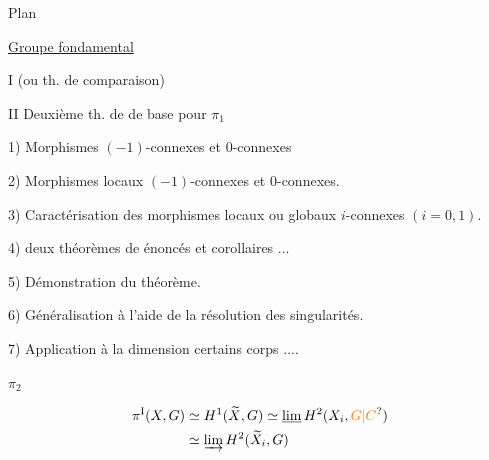 Plan


\uline{Groupe fondamental}

I   (ou th. de comparaison)

II Deuxième th. de  de base pour $\pi_1$

1) Morphismes $(-1)$-connexes et $0$-connexes

2) Morphismes locaux $(-1)$-connexes et $0$-connexes.

3)  Caractérisation des morphismes locaux ou globaux $i$-connexes $(i=0,1)$.

4)  deux théorèmes de   énoncés et corollaires ...

5)  Démonstration du théorème.

6) Généralisation à l'aide de la résolution des singularités.

7) Application à la dimension   certains corps ....


$\pi_2$



\[
\begin{aligned}
\pi^{\mathrm{I}}(X,G)&\simeq H^{1}(\widetilde X,G)\simeq\underline{\lim}\,H^2(X_i,\unsure{G|C})\\
&\simeq\varinjlim H^2(\widetilde X_i,G)
\end{aligned}
\]


